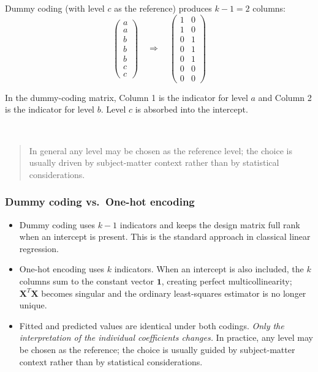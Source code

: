 \documentclass[
]{book}
\begin{document}
Dummy coding (with level \(c\) as the reference) produces \(k-1 = 2\) columns:
\[\begin{pmatrix}
a \\ a \\ b \\ b \\ b \\ c \\ c
\end{pmatrix}
\quad\Longrightarrow\quad
\begin{pmatrix}
1 & 0 \\
1 & 0 \\
0 & 1 \\
0 & 1 \\
0 & 1 \\
0 & 0 \\
0 & 0
\end{pmatrix}\]

In the dummy-coding matrix, Column 1 is the indicator for level \(a\) and Column 2 is the indicator for level \(b\). Level \(c\) is absorbed into the intercept.

~

\begin{quote}
In general any level may be chosen as the reference level; the choice is usually driven by subject-matter context rather than by statistical considerations.
\end{quote}

\subsubsection*{Dummy coding vs.~One-hot encoding}\label{dummy-coding-vs.-one-hot-encoding}

\begin{itemize}
\item
  Dummy coding uses \(k-1\) indicators and keeps the design matrix full rank when an intercept is present. This is the standard approach in classical linear regression.
\item
  One-hot encoding uses \(k\) indicators. When an intercept is also included, the \(k\) columns sum to the constant vector \(\mathbf{1}\), creating perfect multicollinearity; \(\mathbf{X}^T\mathbf{X}\) becomes singular and the ordinary least-squares estimator is no longer unique.
\item
  Fitted and predicted values are identical under both codings. \emph{Only the interpretation of the individual coefficients changes.} In practice, any level may be chosen as the reference; the choice is usually guided by subject-matter context rather than by statistical considerations.
\end{itemize}
\end{document}
